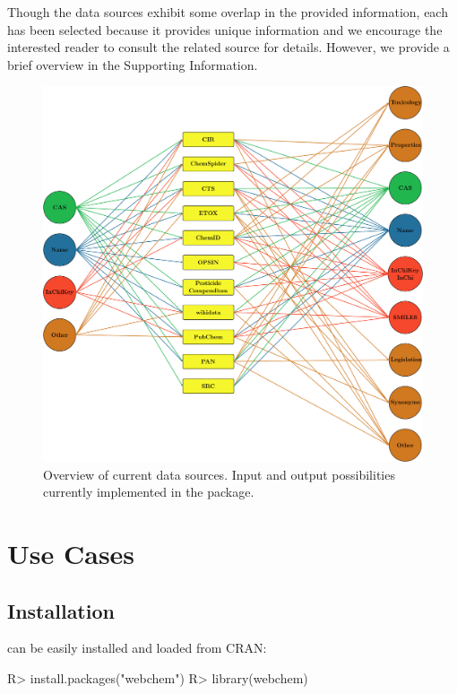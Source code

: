 \documentclass[article, shortnames]{jss}\usepackage[]{graphicx}\usepackage[]{color}
\begin{document}
Though the data sources exhibit some overlap in the provided information, each has been selected because it provides unique information and we encourage the interested reader to consult the related source for details. 
However, we provide a brief overview in the Supporting Information.

\begin{figure}[ht]
  \centering
  \includegraphics{fig1.pdf}
  \caption{Overview of current data sources. Input and output possibilities currently implemented in the package.}
  \label{fig:fig1}
\end{figure}


\section[Use Cases]{Use Cases}
\subsection[Install webchem]{Installation}
 can be easily installed and loaded from CRAN:

\begin{CodeChunk}
\begin{CodeInput}
R> install.packages("webchem")
R> library(webchem)
\end{CodeInput}
\end{CodeChunk}
\end{document}
